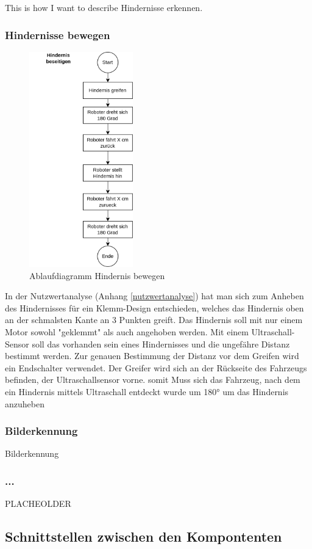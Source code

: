This is how I want to describe Hindernisse erkennen.

\subsubsection{Hindernisse bewegen}

\begin{figure}[H]
\centering
\includegraphics[width=0.4\textwidth]{assets/gesamtkonzept/ablaufdiagramm-hindernis-bewegen.png}
\caption{Ablaufdiagramm Hindernis bewegen}
\label{fig:ablaufdiagramm-hindernis-bewegen}
\end{figure}

In der Nutzwertanalyse (Anhang \ref{nutzwertanalyse}) hat man sich zum Anheben des Hindernisses für ein Klemm-Design entschieden, welches das Hindernis oben an der schmalsten Kante an 3 Punkten greift. Das Hindernis soll mit nur einem Motor sowohl "geklemmt" als auch angehoben werden. Mit einem Ultraschall-Sensor soll das vorhanden sein eines Hindernisses und die ungefähre Distanz bestimmt werden. Zur genauen Bestimmung der Distanz vor dem Greifen wird ein Endschalter verwendet.
Der Greifer wird sich an der Rückseite des Fahrzeugs befinden, der Ultraschallsensor vorne. somit Muss sich das Fahrzeug, nach dem ein Hindernis mittels Ultraschall entdeckt wurde um 180° um das Hindernis anzuheben
  
\subsubsection{Bilderkennung}

Bilderkennung

\subsubsection{...}

PLACHEOLDER

\subsection{Schnittstellen zwischen den Kompontenten}



